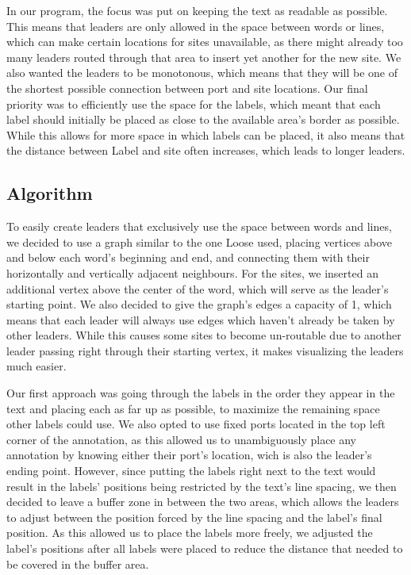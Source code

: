 \documentclass[11pt,a4paper]{vutinfth}
\begin{document}
In our program, the focus was put on keeping the text as readable as possible. This means that leaders are only allowed in the space between words or lines, which can make certain locations for sites unavailable, as there might already too many leaders routed through that area to insert yet another for the new site. 
We also wanted the leaders to be monotonous, which means that they will be one of the shortest possible connection between port and site locations.
Our final priority was to efficiently use the space for the labels, which meant that each label should initially be placed as close to the available area's border as possible.
While this allows for more space in which labels can be placed, it also means that the distance between Label and site often increases, which leads to longer leaders.%

\subsection{Algorithm}%
To easily create leaders that exclusively use the space between words and lines, we decided to use a graph similar to the one Loose \cite{Loose2015} used, placing vertices above and below each word's beginning and end, and connecting them with their horizontally and vertically adjacent neighbours.%
For the sites, we inserted an additional vertex above the center of the word, which will serve as the leader's starting point. We also decided to give the graph's edges a capacity of 1, which means that each leader will always use edges which haven't already be taken by other leaders. While this causes some sites to become un-routable due to another leader passing right through their starting vertex, it makes visualizing the leaders much easier.

Our first approach was going through the labels in the order they appear in the text and placing each as far up as possible, to maximize the remaining space other labels could use. We also opted to use fixed ports located in the top left corner of the annotation, as this allowed us to unambiguously place any annotation by knowing either their port's location, wich is also the leader's ending point.
However, since putting the labels right next to the text would result in the labels' positions being restricted by the text's line spacing, we then decided to leave a buffer zone in between the two areas, which allows the leaders to adjust between the position forced by the line spacing and the label's final position. As this allowed us to place the labels more freely, we adjusted the label's positions after all labels were placed to reduce the distance that needed to be covered in the buffer area.
\end{document}
